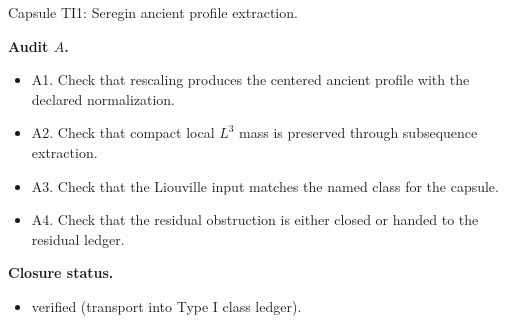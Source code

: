 \documentclass[11pt]{amsart}
\newcommand{\capsulefield}[1]{\par\smallskip\noindent\textbf{#1.}\ }
\begin{document}
\begin{proofcapsule}{Capsule TI1: Seregin ancient profile extraction.}
  \capsulefield{Audit \(A\)}
  \begin{itemize}[leftmargin=1.8em]
  \item A1. Check that rescaling produces the centered ancient profile with the declared normalization.
  \item A2. Check that compact local $L^3$ mass is preserved through subsequence extraction.
  \item A3. Check that the Liouville input matches the named class for the capsule.
  \item A4. Check that the residual obstruction is either closed or handed to the residual ledger.
  \end{itemize}
  \capsulefield{Closure status}
  \begin{itemize}[leftmargin=1.8em]
  \item verified (transport into Type I class ledger).
  \end{itemize}
\end{proofcapsule}
\end{document}
